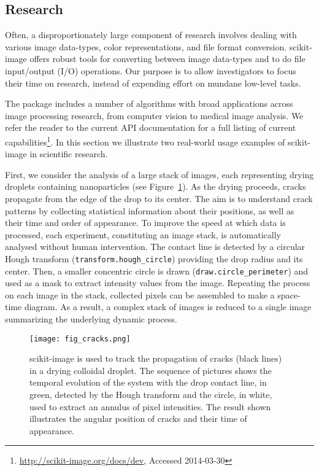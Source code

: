 
  \subsection*{Research}
    \label{sub:research}

    Often, a disproportionately large component of research involves dealing with various image data-types, color representations, and file format conversion. scikit-image offers robust tools for converting between image data-types \citep{DirectX,OpenGL,GraphicsGemsI} and to do file input/output (I/O) operations.  Our purpose is to allow investigators to focus their time on research, instead of expending effort on mundane low-level tasks.

    The package includes a number of algorithms with broad applications across image processing research, from computer vision to medical image analysis. We refer the reader to the current API documentation for a full listing of current capabilities\footnote{\url{http://scikit-image.org/docs/dev}, Accessed 2014-03-30}. In this section we illustrate two real-world usage examples of scikit-image in scientific research.

    First, we consider the analysis of a large stack of images, each representing drying droplets containing nanoparticles (see Figure~\ref{fig:cracks}). As the drying proceeds, cracks propagate from the edge of the drop to its center. The aim is to understand crack patterns by collecting statistical information about their positions, as well as their time and order of appearance. To improve the speed at which data is processed, each experiment, constituting an image stack, is automatically analysed without human intervention. The contact line is detected by a circular Hough transform (\texttt{transform.hough\_circle}) providing the drop radius and its center. Then, a smaller concentric circle is drawn (\texttt{draw.circle\_perimeter}) and used as a mask to extract intensity values from the image. Repeating the process on each image in the stack, collected pixels can be assembled to make a space-time diagram. As a result, a complex stack of images is reduced to a single image summarizing the underlying dynamic process.

    \begin{figure}[bht]
      \texttt{[image: fig\_cracks.png]}

      \caption{scikit-image is used to track the propagation of cracks (black lines) in a drying colloidal droplet. The sequence of pictures shows the temporal evolution of the system with the drop contact line, in green, detected by the Hough transform and the circle, in white, used to extract an annulus of pixel intensities.  The result shown illustrates the angular position of cracks and their time of appearance. \label{fig:cracks}}
    \end{figure}

